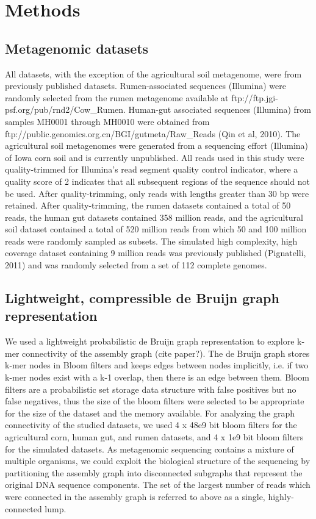 \documentclass[11pt]{article} %
\begin{document}
\section{Methods}

\subsection{Metagenomic datasets}

All datasets, with the exception of the agricultural soil metagenome, were from previously published datasets. Rumen-associated sequences (Illumina) were randomly selected from the rumen metagenome available at ftp://ftp.jgi-psf.org/pub/rnd2/Cow\_Rumen. Human-gut associated sequences (Illumina) from samples MH0001 through MH0010 were obtained from ftp://public.genomics.org.cn/BGI/gutmeta/Raw\_Reads (Qin et al, 2010). The agricultural soil metagenomes were generated from a sequencing effort (Illumina) of Iowa corn soil and is currently unpublished. All reads used in this study were quality-trimmed for Illumina's read segment quality control indicator, where a quality score of 2 indicates that all subsequent regions of the sequence should not be used. After quality-trimming, only reads with lengths greater than 30 bp were retained. After quality-trimming, the rumen datasets contained a total of 50 reads, the human gut datasets contained 358 million reads, and the agricultural soil dataset contained a total of 520 million reads from which 50 and 100 million reads were randomly sampled as subsets. The simulated high complexity, high coverage dataset containing 9 million reads was previously published (Pignatelli, 2011) and was randomly selected from a set of 112 complete genomes.


\subsection{Lightweight, compressible de Bruijn graph representation}

We used a lightweight probabilistic de Bruijn graph representation to explore k-mer connectivity of the assembly graph (cite paper?). The de Bruijn graph stores k-mer nodes in Bloom filters and keeps edges between nodes implicitly, i.e. if two k-mer nodes exist with a k-1 overlap, then there is an edge between them. Bloom filters are a probabilistic set storage data structure with false positives but no false negatives, thus the size of the bloom filters were selected to be appropriate for the size of the dataset and the memory available. For analyzing the graph connectivity of the studied datasets, we used 4 x 48e9 bit bloom filters for the agricultural corn, human gut, and rumen datasets, and 4 x 1e9 bit bloom filters for the simulated datasets.  As metagenomic sequencing contains a mixture of multiple organisms, we could exploit the biological structure of the sequencing by partitioning the assembly graph into disconnected subgraphs that represent the
original DNA sequence components. The set of the largest number of reads which were connected in the assembly graph is referred to above as a single, highly-connected lump. 
\end{document}
